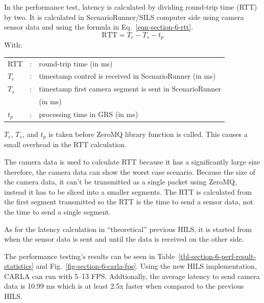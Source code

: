 In the performance test, latency is calculated by dividing round-trip time (RTT) by two.
It is calculated in ScenarioRunner/SILS computer side using camera sensor data
and using the formula in Eq.~\ref{eqn-section-6-rtt}.
\begin{equation}
	\label{eqn-section-6-rtt}
	\text{RTT} = T_{e} - T_{s} - t_p
\end{equation}
With:
\begin{table}[!h]
	\begin{tabular}{l l l}
		RTT     & : & round-trip time (in ms)                                  \\
		$T_{e}$ & : & timestamp control is received in ScenarioRunner (in ms)  \\
		$T_{s}$ & : & timestamp first camera segment is sent in ScenarioRunner \\
		        &   & (in ms)                                                  \\
		$t_p$   & : & processing time in GRS (in ms)
	\end{tabular}
\end{table}

$T_e$, $T_s$, and $t_p$ is taken before ZeroMQ library function is called. This
causes a small overhead in the RTT calculation.

The camera data is used to calculate RTT because it has a significantly large
size therefore, the camera data can show the worst case scenario.  Because the
size of the camera data, it can't be transmitted as a single packet using
ZeroMQ, instead it has to be sliced into a smaller segments. The RTT is
calculated from the first segment transmitted so the RTT is the time to send a
sensor data, not the time to send a single segment.

As for the latency calculation in ``theoretical'' previous HILS, it is started
from when the sensor data is sent and until the data is received on the other
side.

The performance testing's results can be seen in
Table~\ref{tbl-section-6-perf-result-statistics} and
Fig.~\ref{fig-section-6-carla-fps}. Using the new HILS implementation, CARLA can
run with 5--13 FPS. Addtionally, the average latency to send camera data is
10.99 ms which is at least 2.5x faster when compared to the previous HILS.

